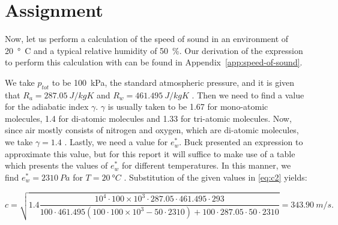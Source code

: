 \documentclass[11pt,titlepage]{report}
\begin{document}
\section{Assignment}
Now, let us perform a calculation of the speed of sound in an environment of \SI{20}{\degree C} and a typical relative humidity of \SI{50}{\%}. Our derivation of the expression to perform this calculation with can be found in Appendix~\ref{app:speed-of-sound}.

We take $p_{tot}$ to be \SI{100}{kPa}, the standard atmospheric pressure, and it is given that $R_a = \SI{287.05}{J/kgK}$ and $R_w = \SI{461.495}{J/kgK}$ \cite{sengpiel-sound-speed}. Then we need to find a value for the adiabatic index $\gamma$. $\gamma$ is usually taken to be \num{1.67} for mono-atomic molecules, \num{1.4} for di-atomic molecules and \num{1.33} for tri-atomic molecules. Now, since air mostly consists of nitrogen and oxygen, which are di-atomic molecules, we take $\gamma = 1.4$ \cite{eng-tb-air-comp}. Lastly, we need a value for $e^*_w$. Buck \cite{buck-sat-press} presented an expression to approximate this value, but for this report it will suffice to make use of a table which presents the values of $e^*_w$ for different temperatures. In this manner, we find $e^*_w = \SI{2310}{Pa}$ for $T = \SI{20}{\degree C}$ \cite{eng-tb-sat-press}.
Substitution of the given values in \ref{eq:c2} yields:

\begin{equation}
	c = \sqrt{1.4 \frac{10^4 \cdot 100 \times 10^3 \cdot 287.05 \cdot 461.495 \cdot 293}{100 \cdot 461.495(100 \cdot 100 \times 10^3 - 50 \cdot 2310) + 100 \cdot 287.05 \cdot 50 \cdot 2310}} = \SI{343.90}{m/s}.
\end{equation}
\end{document}
